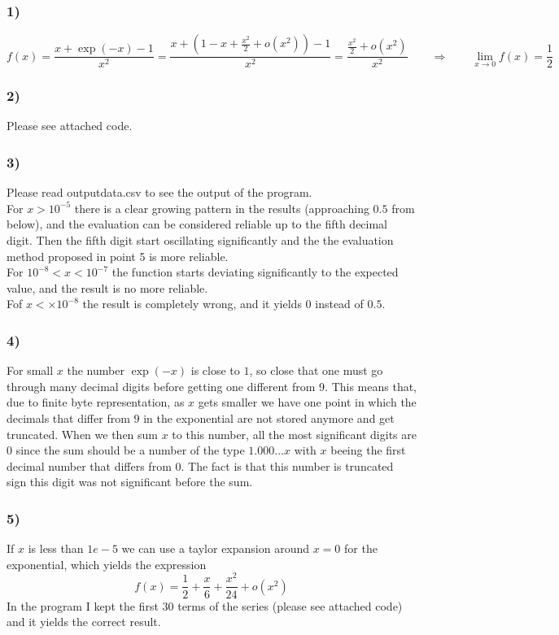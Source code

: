 \documentclass{article}
\begin{document}
\subsubsection*{1)}
\begin{equation*}
    f(x)=\frac{x+\exp (-x)-1}{x^{2}} = \frac{x + \left(1 - x + \frac{x^2}{2} + o(x^2)\right) - 1}{x^2} = \frac{\frac{x^2}{2} + o(x^2)}{x^2} \qquad \Longrightarrow \qquad \lim_{x \to 0} f(x) = \frac{1}{2}
\end{equation*}
\subsubsection*{2)}
Please see attached code.
\subsubsection*{3)}
Please read outputdata.csv to see the output of the program. \\
For $x > 10^{-5}$ there is a clear growing pattern in the results (approaching $0.5$ from below), and the evaluation can be considered reliable up to the fifth decimal digit. Then the fifth digit start oscillating significantly and the the
evaluation method proposed in point 5 is more reliable. \\
For $10^{-8} < x < 10^{-7}$  the function starts deviating significantly to the expected value, and the result is no more reliable. \\
Fof $x < \times 10^{-8}$ the result is completely wrong, and it yields $0$ instead of $0.5$.
\subsubsection*{4)}
For small $x$ the number $\exp(-x)$ is close to $1$, so close that one must go through many decimal digits before getting one different from 9. This means that, due to finite byte representation, 
as $x$ gets smaller we have one point in which the decimals that differ from $9$ in the exponential are not stored anymore and get truncated. When we then sum $x$ to this number, all the most significant digits are 0 since the sum should be a number 
of the type $1.000\dots x$ with $x$ beeing the first decimal number that differs from 0. The fact is that this number is truncated sign this digit was not significant before the sum.
\subsubsection*{5)}
If $x$ is less than $1e-5$ we can use a taylor expansion around $x=0$ for the exponential, which yields the expression
\begin{equation*}
    f(x) = \frac{1}{2} + \frac{x}{6} + \frac{x^2}{24} + o(x^2)
\end{equation*}
In the program I kept the first 30 terms of the series (please see attached code) and it yields the correct result.
\end{document}
